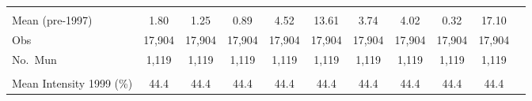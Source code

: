 \begin{tabular}{lcccccccccc}
  & & & & & & & & & \\ 
Mean (pre-1997) &         1.80 &         1.25 &         0.89 &         4.52 &        13.61 &         3.74 &         4.02 &         0.32 &        17.10 \\ 
Obs &       17,904 &       17,904 &       17,904 &       17,904 &       17,904 &       17,904 &       17,904 &       17,904 &       17,904 \\ 
No.\ Mun &        1,119 &        1,119 &        1,119 &        1,119 &        1,119 &        1,119 &        1,119 &        1,119 &        1,119 \\ 
  & & & & & & & & & \\ 
Mean Intensity 1999 (\%) &   44.4 &   44.4 &   44.4 &   44.4 &   44.4 &   44.4 &   44.4 &   44.4 &   44.4 \\ 
\bottomrule
\end{tabular}